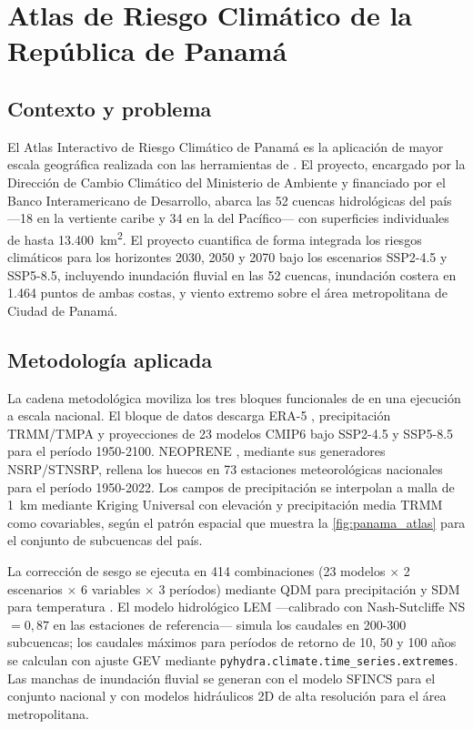 \clearpage
\section{Atlas de Riesgo Climático de la República de Panamá}
\label{sec:caso_panama}

\subsection{Contexto y problema}

El Atlas Interactivo de Riesgo Climático de Panamá \parencite{ihcantabria2023panama} es la aplicación de mayor escala geográfica realizada con las herramientas de \hydra. El proyecto, encargado por la Dirección de Cambio Climático del Ministerio de Ambiente y financiado por el Banco Interamericano de Desarrollo, abarca las 52 cuencas hidrológicas del país ---18 en la vertiente caribe y 34 en la del Pacífico--- con superficies individuales de hasta 13.400~km\textsuperscript{2}. El proyecto cuantifica de forma integrada los riesgos climáticos para los horizontes 2030, 2050 y 2070 bajo los escenarios SSP2-4.5 y SSP5-8.5, incluyendo inundación fluvial en las 52 cuencas, inundación costera en 1.464 puntos de ambas costas, y viento extremo sobre el área metropolitana de Ciudad de Panamá.

\subsection{Metodología aplicada}

La cadena metodológica moviliza los tres bloques funcionales de \hydra en una ejecución a escala nacional. El bloque de datos descarga ERA-5 \parencite{hersbach2020era5}, precipitación TRMM/TMPA \parencite{huffman2007trmm} y proyecciones de 23 modelos CMIP6 \parencite{eyring2016cmip6} bajo SSP2-4.5 y SSP5-8.5 para el período 1950-2100. NEOPRENE \parencite{diezsierra2023neoprene}, mediante sus generadores NSRP/STNSRP, rellena los huecos en 73 estaciones meteorológicas nacionales para el período 1950-2022. Los campos de precipitación se interpolan a malla de 1~km mediante Kriging Universal con elevación y precipitación media TRMM como covariables, según el patrón espacial que muestra la \cref{fig:panama_atlas} para el conjunto de subcuencas del país.

La corrección de sesgo se ejecuta en 414 combinaciones (23 modelos $\times$ 2 escenarios $\times$ 6 variables $\times$ 3 períodos) mediante QDM para precipitación \parencite{cannon2015sdm} y SDM para temperatura \parencite{switanek2017sdm}. El modelo hidrológico LEM ---calibrado con Nash-Sutcliffe NS $= 0{,}87$ en las estaciones de referencia--- simula los caudales en 200-300 subcuencas; los caudales máximos para períodos de retorno de 10, 50 y 100 años se calculan con ajuste GEV mediante \texttt{pyhydra.climate.time\_series.extremes}. Las manchas de inundación fluvial se generan con el modelo SFINCS para el conjunto nacional y con modelos hidráulicos 2D de alta resolución para el área metropolitana.

